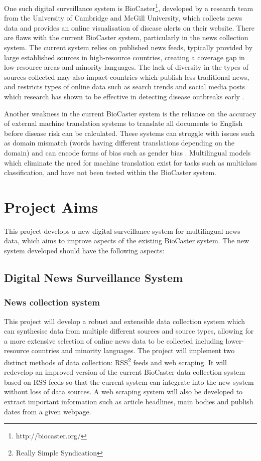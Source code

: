 \documentclass{l4proj}
\begin{document}
One such digital surveillance system is BioCaster\footnote{http://biocaster.org/}, developed by a research team from the University of Cambridge and McGill University, which collects news data and provides an online visualisation of disease alerts on their website. There are flaws with the current BioCaster system, particularly in the news collection system. The current system relies on published news feeds, typically provided by large established sources in high-resource countries, creating a coverage gap in low-resource areas and minority languages. The lack of diversity in the types of sources collected may also impact countries which publish less traditional news, and restricts types of online data such as search trends and social media posts which research has shown to be effective in detecting disease outbreaks early \citep{seo2017methods}. \par
Another weakness in the current BioCaster system is the reliance on the accuracy of external machine translation systems to translate all documents to English before disease risk can be calculated. These systems can struggle with issues such as domain mismatch (words having different translations depending on the domain) \citep{koehn2017six} and can encode forms of bias such as gender bias \citep{stanovsky2019evaluating}. Multilingual models which eliminate the need for machine translation exist for tasks such as multiclass classification, and have not been tested within the BioCaster system.

\section{Project Aims}
This project develops a new digital surveillance system for multilingual news data, which aims to improve aspects of the existing BioCaster system. The new system developed should have the following aspects: 
\subsection{Digital News Surveillance System} \hfill \par
\subsubsection{News collection system}
This project will develop a robust and extensible data collection system which can synthesise data from multiple different sources and source types, allowing for a more extensive selection of online news data to be collected including lower-resource countries and minority languages. The project will implement two distinct methods of data collection: RSS\footnote{Really Simple Syndication} feeds and web scraping. It will redevelop an improved version of the current BioCaster data collection system based on RSS feeds so that the current system can integrate into the new system without loss of data sources. A web scraping system will also be developed to extract important information such as article headlines, main bodies and publish dates from a given webpage.
\end{document}
